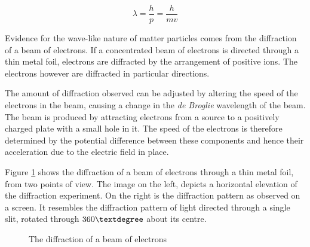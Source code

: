 \documentclass[10pt]{article}
\begin{document}
\[ \lambda  = \dfrac{h}{p} = \dfrac{h}{mv}\]

Evidence for the wave-like nature of matter particles comes from the diffraction of a beam of electrons. If a concentrated beam of electrons is directed through a thin metal foil, electrons are diffracted by the arrangement of positive ions. The electrons however are diffracted in particular directions.

The amount of diffraction observed can be adjusted by altering the speed of the electrons in the beam, causing a change in the \emph{de Broglie} wavelength of the beam. The beam is produced by attracting electrons from a source to a positively charged plate with a small hole in it. The speed of the electrons is therefore determined by the potential difference between these components and hence their acceleration due to the electric field in place.

Figure \ref{img:electron_diffraction} shows the diffraction of a beam of electrons through a thin metal foil, from two points of view. The image on the left, depicts a horizontal elevation of the diffraction experiment. On the right is the diffraction pattern as observed on a screen. It resembles the diffraction pattern of light directed through a single slit, rotated through \(360 \textdegree\) about its centre.

\begin{figure}[H]
\centering
\begin{minipage}{.45\textwidth}
\centering
{}
\end{minipage}
\begin{minipage}{.45\textwidth}
\centering
{}
\end{minipage}
\caption{The diffraction of a beam of electrons}
\label{img:electron_diffraction}
\end{figure}
\end{document}
